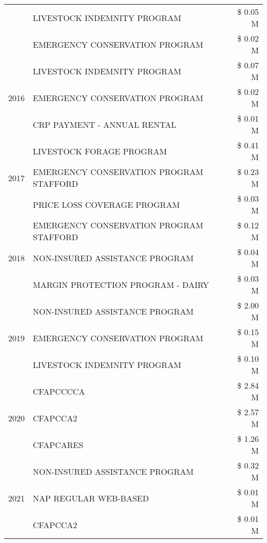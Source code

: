 \begin{tabular}{llr}
 & LIVESTOCK INDEMNITY PROGRAM & \$ 0.05 M \\
 & EMERGENCY CONSERVATION PROGRAM & \$ 0.02 M \\
\cline{1-3}
\multirow[t]{3}{*}{2016} & LIVESTOCK INDEMNITY PROGRAM                   & \$ 0.07 M \\
 & EMERGENCY CONSERVATION PROGRAM                & \$ 0.02 M \\
 & CRP PAYMENT - ANNUAL RENTAL                   & \$ 0.01 M \\
\cline{1-3}
\multirow[t]{3}{*}{2017} & LIVESTOCK FORAGE PROGRAM & \$ 0.41 M \\
 & EMERGENCY CONSERVATION PROGRAM STAFFORD & \$ 0.23 M \\
 & PRICE LOSS COVERAGE PROGRAM & \$ 0.03 M \\
\cline{1-3}
\multirow[t]{3}{*}{2018} & EMERGENCY CONSERVATION PROGRAM STAFFORD & \$ 0.12 M \\
 & NON-INSURED ASSISTANCE PROGRAM & \$ 0.04 M \\
 & MARGIN PROTECTION PROGRAM - DAIRY & \$ 0.03 M \\
\cline{1-3}
\multirow[t]{3}{*}{2019} & NON-INSURED ASSISTANCE PROGRAM & \$ 2.00 M \\
 & EMERGENCY CONSERVATION PROGRAM & \$ 0.15 M \\
 & LIVESTOCK INDEMNITY PROGRAM & \$ 0.10 M \\
\cline{1-3}
\multirow[t]{3}{*}{2020} & CFAPCCCCA & \$ 2.84 M \\
 & CFAPCCA2 & \$ 2.57 M \\
 & CFAPCARES & \$ 1.26 M \\
\cline{1-3}
\multirow[t]{3}{*}{2021} & NON-INSURED ASSISTANCE PROGRAM & \$ 0.32 M \\
 & NAP REGULAR WEB-BASED & \$ 0.01 M \\
 & CFAPCCA2 & \$ 0.01 M \\
\cline{1-3}
\bottomrule
\end{tabular}
